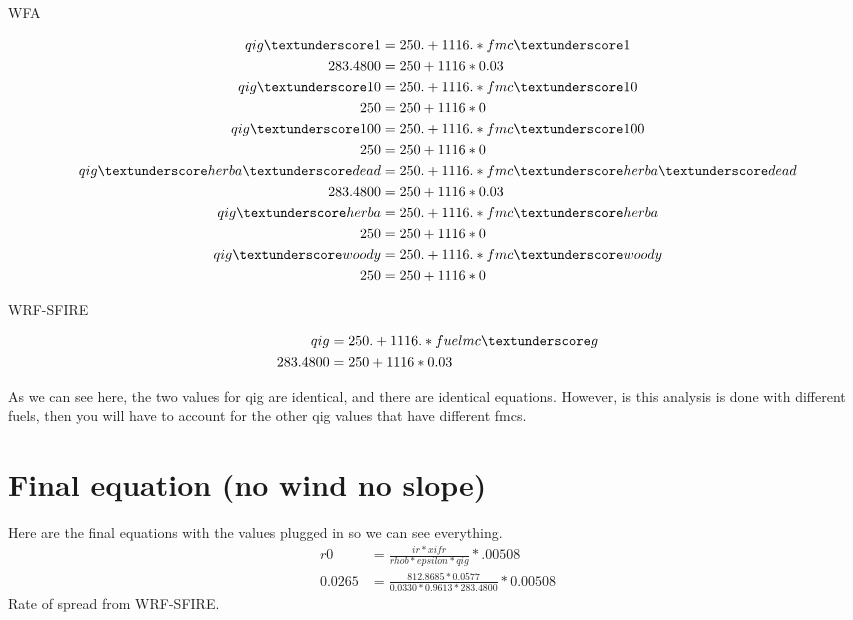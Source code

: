 \documentclass{article}
\newcommand\und{\textunderscore}
\begin{document}
WFA

\begin{equation}
\label{qig_WFA}
	\begin{split}
	qig\und 1         &= 250. + 1116.*fmc\und 1 \\
	283.4800 &= 250 + 1116 * 0.03 \\
qig\und 10        &= 250. + 1116.*fmc\und 10 \\
250 &= 250 + 1116 * 0 \\
qig\und 100       &= 250. + 1116.*fmc\und 100 \\
250 &= 250 + 1116 * 0 \\
qig\und herba\und dead &= 250. + 1116.*fmc\und herba\und dead \\
283.4800 &= 250 + 1116 * 0.03 \\
qig\und herba     &= 250. + 1116.*fmc\und herba \\
250 &= 250 + 1116 * 0 \\
qig\und woody     &= 250. + 1116.*fmc\und woody \\
250 &= 250 + 1116 * 0 
\end{split}
\end{equation}

WRF-SFIRE


\begin{equation}
	\begin{split}
		qig &= 250. + 1116.*fuelmc \textunderscore g \\
		283.4800 &= 250 + 1116 * 0.03
	\end{split}
\end{equation}

As we can see here, the two values for qig are identical, and there are identical equations. However, is this analysis is done with different fuels, then you will have to account for the other qig values that have different fmcs. 


\section{Final equation (no wind no slope)}
Here are the final equations with the values plugged in so we can see everything. 
\begin{equation}
	\label{WRF-ROS}
	\begin{split}
		r0 &= \frac{ir*xifr}{rhob * epsilon *qig} * .00508 \\
		0.0265 &= \frac{812.8685 * 0.0577}{0.0330 * 0.9613 * 283.4800} * 0.00508
	\end{split}
\end{equation}
Rate of spread from WRF-SFIRE. 
\end{document}
